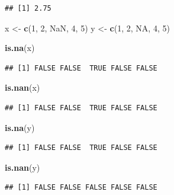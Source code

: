 \documentclass[
]{book}
\newenvironment{Shaded}{\begin{snugshade}}{\end{snugshade}}
\newcommand{\ConstantTok}[1]{\textcolor[rgb]{0.56,0.35,0.01}{#1}}
\newcommand{\DecValTok}[1]{\textcolor[rgb]{0.00,0.00,0.81}{#1}}
\newcommand{\FunctionTok}[1]{\textcolor[rgb]{0.13,0.29,0.53}{\textbf{#1}}}
\newcommand{\NormalTok}[1]{#1}
\newcommand{\OtherTok}[1]{\textcolor[rgb]{0.56,0.35,0.01}{#1}}
\begin{document}
\begin{verbatim}
## [1] 2.75
\end{verbatim}

\begin{Shaded}
\begin{Highlighting}[]
\NormalTok{x }\OtherTok{\textless{}{-}} \FunctionTok{c}\NormalTok{(}\DecValTok{1}\NormalTok{, }\DecValTok{2}\NormalTok{, }\ConstantTok{NaN}\NormalTok{, }\DecValTok{4}\NormalTok{, }\DecValTok{5}\NormalTok{)}
\NormalTok{y }\OtherTok{\textless{}{-}} \FunctionTok{c}\NormalTok{(}\DecValTok{1}\NormalTok{, }\DecValTok{2}\NormalTok{, }\ConstantTok{NA}\NormalTok{, }\DecValTok{4}\NormalTok{, }\DecValTok{5}\NormalTok{)}
    
\FunctionTok{is.na}\NormalTok{(x)  }
\end{Highlighting}
\end{Shaded}

\begin{verbatim}
## [1] FALSE FALSE  TRUE FALSE FALSE
\end{verbatim}

\begin{Shaded}
\begin{Highlighting}[]
\FunctionTok{is.nan}\NormalTok{(x) }
\end{Highlighting}
\end{Shaded}

\begin{verbatim}
## [1] FALSE FALSE  TRUE FALSE FALSE
\end{verbatim}

\begin{Shaded}
\begin{Highlighting}[]
\FunctionTok{is.na}\NormalTok{(y) }
\end{Highlighting}
\end{Shaded}

\begin{verbatim}
## [1] FALSE FALSE  TRUE FALSE FALSE
\end{verbatim}

\begin{Shaded}
\begin{Highlighting}[]
\FunctionTok{is.nan}\NormalTok{(y)}
\end{Highlighting}
\end{Shaded}

\begin{verbatim}
## [1] FALSE FALSE FALSE FALSE FALSE
\end{verbatim}
\end{document}
